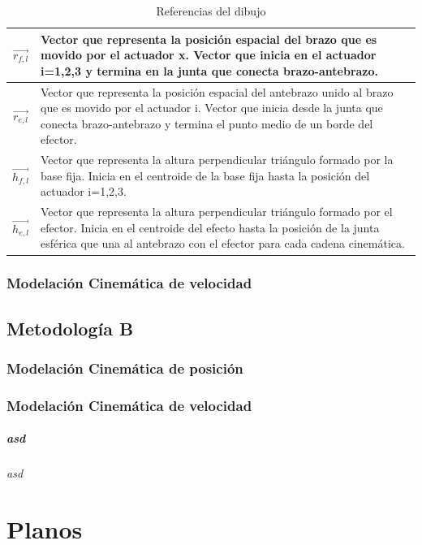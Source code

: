 \begin{table}[H]
\begin{tabular}{|c|m{12cm}|}
               $\overrightarrow{r_{f,l}}$  & Vector que representa la posición espacial del brazo que es movido por el actuador x. Vector que inicia en el actuador i=1,2,3 y termina en la junta que conecta brazo-antebrazo.     \\\hline
              $\overrightarrow{r_{e,l}}$  & Vector que representa la posición espacial del antebrazo unido al brazo que es movido por el actuador i. Vector que inicia desde la junta que conecta brazo-antebrazo y termina el punto medio de un borde del efector.    \\\hline
              $\overrightarrow{h_{f,l}}$  & Vector que representa la altura perpendicular triángulo formado por la base fija. Inicia en el centroide de la base fija hasta la posición del actuador i=1,2,3.    \\\hline
              $\overrightarrow{h_{e,l}}$  & Vector que representa la altura perpendicular triángulo formado por el efector. Inicia en el centroide del efecto hasta la posición de la junta esférica que una al antebrazo con el efector para cada cadena cinemática.    \\\hline
            \end{tabular}
            \caption{Referencias del dibujo}
            \label{tab:Anexo_B_my_label2}
        \end{table}
        \endgroup
        
        \subsection{Modelación Cinemática de velocidad}
        
        
    \section{Metodología B}
        \subsection{Modelación Cinemática de posición}
        \subsection{Modelación Cinemática de velocidad}
        
        

            \paragraph{asd} 
                \subparagraph{asd}

        
\chapter{Planos}\label{anexoC}
\thispagestyle{fancy}
    \section{}
        \subsection{}